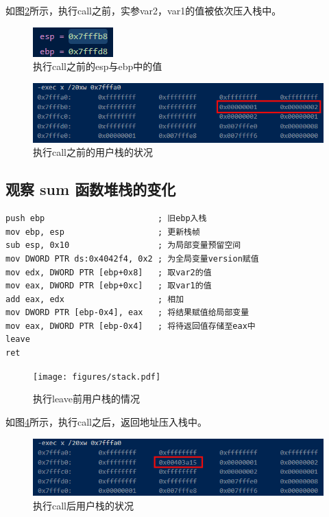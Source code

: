 如图\ref{beforeCall}所示，执行call之前，实参var2，var1的值被依次压入栈中。

\begin{figure}[!htbp]
    \centering
    \includegraphics[scale=1]{figures/regBeforeCall.png}
    \caption{执行call之前的esp与ebp中的值}\label{regBeforeCall}
\end{figure}

\begin{figure}[!htbp]
    \centering
    \includegraphics[scale=1]{figures/beforeCall.png}
    \caption{执行call之前的用户栈的状况}\label{beforeCall}
\end{figure}


\subsection{观察 sum 函数堆栈的变化}
\begin{verbatim}
push ebp                       ; 旧ebp入栈
mov ebp, esp                   ; 更新栈帧
sub esp, 0x10                  ; 为局部变量预留空间
mov DWORD PTR ds:0x4042f4, 0x2 ; 为全局变量version赋值
mov edx, DWORD PTR [ebp+0x8]   ; 取var2的值
mov eax, DWORD PTR [ebp+0xc]   ; 取var1的值
add eax, edx                   ; 相加
mov DWORD PTR [ebp-0x4], eax   ; 将结果赋值给局部变量
mov eax, DWORD PTR [ebp-0x4]   ; 将待返回值存储至eax中
leave 
ret 
\end{verbatim}

\begin{figure}[!htbp]
    \centering
    \texttt{[image: figures/stack.pdf]}
    \caption{执行leave前用户栈的情况}\label{stack}
\end{figure}

如图\ref{afterCall}所示，执行call之后，返回地址压入栈中。

\begin{figure}[!htbp]
    \centering
    \includegraphics[scale=1]{figures/afterCall.png}
    \caption{执行call后用户栈的状况}\label{afterCall}
\end{figure}

